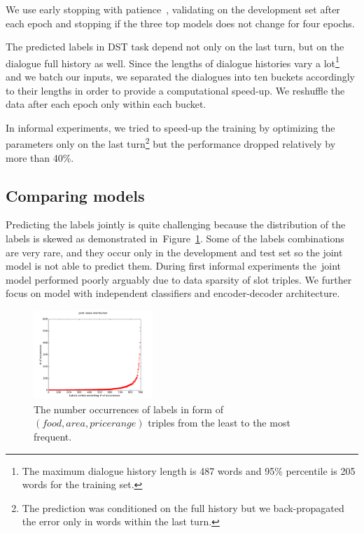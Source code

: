 \documentclass{itatnew}
\begin{document}
We use early stopping with patience~\cite{prechelt1998early}, validating on the development set after each epoch and stopping if the three top models does not change for four epochs.

The predicted labels in DST task depend not only on the last turn, but on the dialogue full history as well.
Since the lengths of dialogue histories vary a lot\footnote{The maximum dialogue history length is 487 words and 95\% percentile is 205 words for the training set.} and we batch our inputs, we separated the dialogues into ten buckets accordingly to their lengths in order to provide a computational speed-up. We reshuffle the data after each epoch only within each bucket.

In informal experiments, we tried to speed-up the training by  optimizing the parameters only on the last turn\footnote{The prediction was conditioned on the full history but we back-propagated the error only in words within the last turn.} but the performance dropped relatively by more than 40\%.

\subsection{Comparing models}
\label{sec:eval}

Predicting the labels jointly is quite challenging because the distribution of the labels is skewed as demonstrated in~Figure~\ref{fig:labels}.
Some of the labels combinations are very rare, and they occur only in the development and test set so the joint model is not able to predict them.
During first informal experiments the~joint model performed poorly arguably due to data sparsity of slot triples. We further focus on model with independent classifiers and encoder-decoder architecture.

\begin{figure}
\vspace{-0.80em}
    \begin{center}
\includegraphics[width=0.4\textwidth]{jointLabelsDistrib}
    \end{center}
\vspace{-1.80em}
\caption{The number occurrences of labels in form of $(food, area, pricerange)$ triples from the least to the most frequent.}
\label{fig:labels}
\end{figure}
\end{document}
